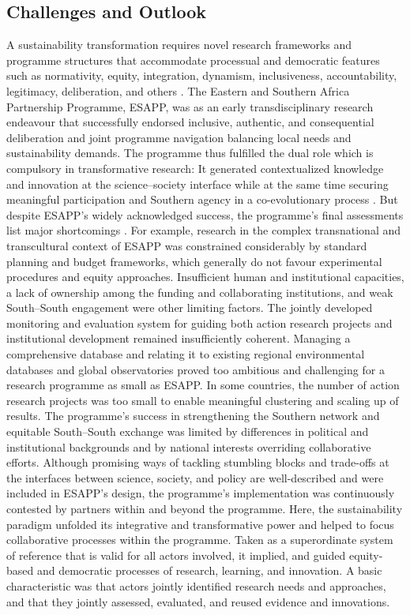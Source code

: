 \documentclass[10pt,a4paper]{article}
\begin{document}
\begin{multicols}{2}
\section{Challenges and Outlook}
\noindent A sustainability transformation requires novel research frameworks and programme structures that accommodate processual and democratic features such as normativity, equity, integration, dynamism, inclusiveness, accountability, legitimacy, deliberation, and others \citep{r04, r25, r37}. The Eastern and Southern Africa Partnership Programme, ESAPP, was as an early transdisciplinary research endeavour that successfully endorsed inclusive, authentic, and consequential deliberation and joint programme navigation balancing local needs and sustainability demands. The programme thus fulfilled the dual role which is compulsory in transformative research: It generated contextualized knowledge and innovation at the science–society interface while at the same time securing meaningful participation and Southern agency in a co-evolutionary process \citep{r55, r68}. But despite ESAPP’s widely acknowledged success, the programme’s final assessments list major shortcomings \citep{r58, r59}. For example, research in the complex transnational and transcultural context of ESAPP was constrained considerably by standard planning and budget frameworks, which generally do not favour experimental procedures and equity approaches. Insufficient human and institutional capacities, a lack of ownership among the funding and collaborating institutions, and weak South–South engagement were other limiting factors. The jointly developed monitoring and evaluation system for guiding both action research projects and institutional development remained insufficiently coherent. Managing a comprehensive database and relating it to existing regional environmental databases and global observatories proved too ambitious and challenging for a research programme as small as ESAPP. In some countries, the number of action research projects was too small to enable meaningful clustering and scaling up of results. The programme's success in strengthening the Southern network and equitable South–South exchange was limited by differences in political and institutional backgrounds and by national interests overriding collaborative efforts. Although promising ways of tackling stumbling blocks and trade-offs at the interfaces between science, society, and policy are well-described \citep{r36, r39, r41} and were included in ESAPP's design, the programme's implementation was continuously contested by partners within and beyond the programme. Here, the sustainability paradigm unfolded its integrative and transformative power and helped to focus collaborative processes within the programme. Taken as a superordinate system of reference that is valid for all actors involved, it implied, and guided equity-based and democratic processes of research, learning, and innovation. A basic characteristic was that actors jointly identified research needs and approaches, and that they jointly assessed, evaluated, and reused evidence and innovations. 


\end{multicols}
\end{document}
